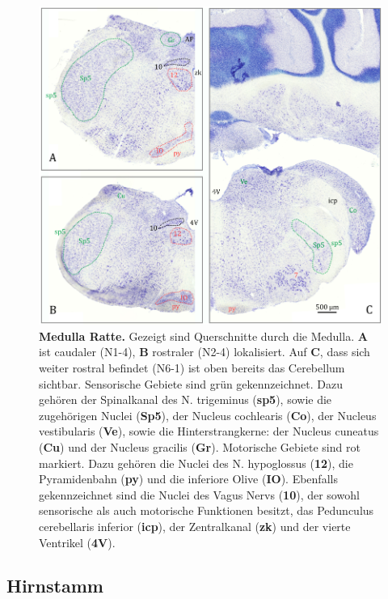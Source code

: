 \documentclass[12pt,a4paper,pdftex]{article}
\begin{document}
\begin{figure}[H]
    \centering
    \includegraphics[width=\textwidth]{pictures/Bilder_Jule/Ratte/medulla.png}
    \caption[Medulla Ratte]{\textbf{Medulla Ratte.} Gezeigt sind Querschnitte durch die Medulla. \textbf{A} ist caudaler (N1-4), \textbf{B} rostraler (N2-4) lokalisiert. Auf \textbf{C}, dass sich weiter rostral befindet (N6-1) ist oben bereits das Cerebellum sichtbar. Sensorische Gebiete sind grün gekennzeichnet. Dazu gehören der Spinalkanal des N. trigeminus (\textbf{sp5}), sowie die zugehörigen Nuclei (\textbf{Sp5}), der Nucleus cochlearis (\textbf{Co}), der Nucleus vestibularis (\textbf{Ve}), sowie die Hinterstrangkerne: der Nucleus cuneatus (\textbf{Cu}) und der Nucleus gracilis (\textbf{Gr}). Motorische Gebiete sind rot markiert. Dazu gehören die Nuclei des N. hypoglossus (\textbf{12}), die Pyramidenbahn (\textbf{py}) und die inferiore Olive (\textbf{IO}). Ebenfalls gekennzeichnet sind die Nuclei des Vagus Nervs (\textbf{10}), der sowohl sensorische als auch motorische Funktionen besitzt, das Pedunculus cerebellaris inferior (\textbf{icp}), der Zentralkanal (\textbf{zk}) und der vierte Ventrikel (\textbf{4V}).} 
    \label{fig:medulla_ratte}
\end{figure}{}


\subsection{Hirnstamm}
\label{subsec:Hirnstamm} 
\end{document}
